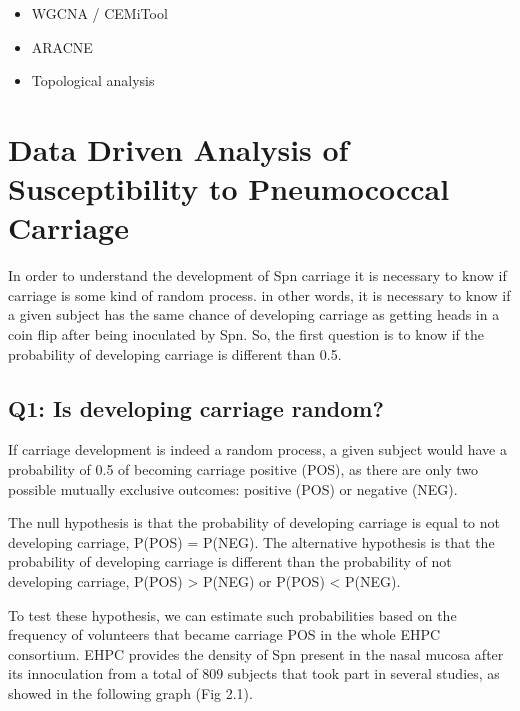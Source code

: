 \documentclass[
]{book}
\providecommand{\tightlist}{%
  \setlength{\itemsep}{0pt}\setlength{\parskip}{0pt}}
\begin{document}
\begin{itemize}
\tightlist
\item
  WGCNA / CEMiTool
\end{itemize}

\begin{itemize}
\item
  ARACNE
\item
  Topological analysis
\end{itemize}

\hypertarget{data-driven-analysis-of-susceptibility-to-pneumococcal-carriage}{%
\chapter{Data Driven Analysis of Susceptibility to Pneumococcal Carriage}\label{data-driven-analysis-of-susceptibility-to-pneumococcal-carriage}}

In order to understand the development of Spn carriage it is necessary to know if carriage is some kind of random process. in other words, it is necessary to know if a given subject has the same chance of developing carriage as getting heads in a coin flip after being inoculated by Spn. So, the first question is to know if the probability of developing carriage is different than 0.5.

\hypertarget{q1-is-developing-carriage-random}{%
\section{Q1: Is developing carriage random?}\label{q1-is-developing-carriage-random}}

If carriage development is indeed a random process, a given subject would have a probability of 0.5 of becoming carriage positive (POS), as there are only two possible mutually exclusive outcomes: positive (POS) or negative (NEG).

The null hypothesis is that the probability of developing carriage is equal to not developing carriage, P(POS) = P(NEG). The alternative hypothesis is that the probability of developing carriage is different than the probability of not developing carriage, P(POS) \textgreater{} P(NEG) or P(POS) \textless{} P(NEG).

To test these hypothesis, we can estimate such probabilities based on the frequency of volunteers that became carriage POS in the whole EHPC consortium. EHPC provides the density of Spn present in the nasal mucosa after its innoculation from a total of 809 subjects that took part in several studies, as showed in the following graph (Fig 2.1).
\end{document}
